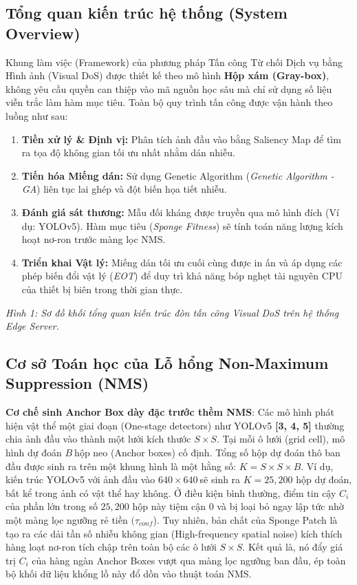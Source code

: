 \documentclass[a4paper,fleqn]{cas-dc}
\begin{document}
\subsection{Tổng quan kiến trúc hệ thống (System Overview)}



Khung làm việc (Framework) của phương pháp Tấn công Từ chối Dịch vụ bằng
Hình ảnh (Visual DoS) được thiết kế theo mô hình \textbf{Hộp xám
(Gray-box)}, không yêu cầu quyền can thiệp vào mã nguồn học sâu mà chỉ
sử dụng số liệu viễn trắc làm hàm mục tiêu. Toàn bộ quy trình tấn công
được vận hành theo luồng như sau:

\begin{enumerate}
\def\labelenumi{\arabic{enumi}.}
\item
  \textbf{Tiền xử lý \& Định vị:} Phân tích ảnh đầu vào bằng Saliency
  Map để tìm ra tọa độ không gian tối ưu nhất nhằm dán nhiễu.
\item
  \textbf{Tiến hóa Miếng dán:} Sử dụng Genetic Algorithm (\emph{Genetic
  Algorithm - GA}) liên tục lai ghép và đột biến họa tiết nhiễu.
\item
  \textbf{Đánh giá sát thương:} Mẫu đối kháng được truyền qua mô hình
  đích (Ví dụ: YOLOv5). Hàm mục tiêu (\emph{Sponge Fitness}) sẽ tính
  toán năng lượng kích hoạt nơ-ron trước màng lọc NMS.
\item
  \textbf{Triển khai Vật lý:} Miếng dán tối ưu cuối cùng được in ấn và
  áp dụng các phép biến đổi vật lý (\emph{EOT}) để duy trì khả năng bóp
  nghẹt tài nguyên CPU của thiết bị biên trong thời gian thực.
\end{enumerate}



\emph{Hình 1: Sơ đồ khối tổng quan kiến trúc đòn tấn công Visual DoS
trên hệ thống Edge Server.}

\subsection{Cơ sở Toán học của Lỗ hổng Non-Maximum Suppression (NMS)}



\textbf{Cơ chế sinh Anchor Box dày đặc trước thềm NMS}: Các mô hình phát
hiện vật thể một giai đoạn (One-stage detectors) như YOLOv5
\textbf{{[}3, 4, 5{]}} thường chia ảnh đầu vào thành một lưới kích thước
\(S \times S\). Tại mỗi ô lưới (grid cell), mô hình dự đoán \(B\ \)hộp
neo (Anchor boxes) cố định. Tổng số hộp dự đoán thô ban đầu được sinh ra
trên một khung hình là một hằng số: \(K = S \times S \times B\). Ví dụ,
kiến trúc YOLOv5 với ảnh đầu vào \(640 \times 640\ \)sẽ sinh ra
\(K = 25,200\) hộp dự đoán, bất kể trong ảnh có vật thể hay không. Ở
điều kiện bình thường, điểm tin cậy \(C_{i}\) của phần lớn trong số
\(25,200\) hộp này tiệm cận \(0\) và bị loại bỏ ngay lập tức nhờ một
màng lọc ngưỡng rẻ tiền \((\tau_{conf}\)). Tuy nhiên, bản chất của
Sponge Patch là tạo ra các dải tần số nhiễu không gian (High-frequency
spatial noise) kích thích hàng loạt nơ-ron tích chập trên toàn bộ các ô
lưới \(S \times S\). Kết quả là, nó đẩy giá trị \(C_{i}\) của hàng ngàn
Anchor Boxes vượt qua màng lọc ngưỡng ban đầu, ép toàn bộ khối dữ liệu
khổng lồ này đổ dồn vào thuật toán NMS.
\end{document}
